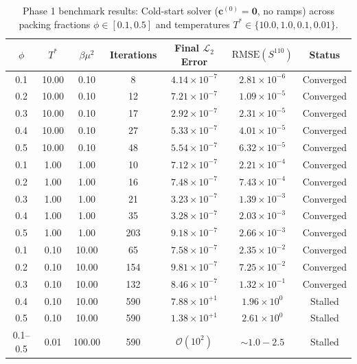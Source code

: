 \documentclass[11pt,a4paper]{article}
\begin{document}
\begin{table}[htbp]
    \centering
    \caption{Phase 1 benchmark results: Cold-start solver ($\mathbf{c}^{(0)}=\mathbf{0}$, no ramps) across packing fractions $\phi \in [0.1, 0.5]$ and temperatures $T^* \in \{10.0, 1.0, 0.1, 0.01\}$.}
    \label{tab:phase1_results}
    \vspace{2mm}
    \begin{tabular}{ccccccc}
        \hline\hline
        $\phi$ & $T^*$ & $\beta\mu^2$ & Iterations & Final $\mathcal{L}_2$ Error & $\text{RMSE}(S^{110})$ & Status \\
        \hline
        0.1 & 10.00 & 0.10  & 8   & $4.14 \times 10^{-7}$ & $2.81 \times 10^{-6}$ & Converged \\
        0.2 & 10.00 & 0.10  & 12  & $7.21 \times 10^{-7}$ & $1.09 \times 10^{-5}$ & Converged \\
        0.3 & 10.00 & 0.10  & 17  & $2.92 \times 10^{-7}$ & $2.31 \times 10^{-5}$ & Converged \\
        0.4 & 10.00 & 0.10  & 27  & $5.33 \times 10^{-7}$ & $4.01 \times 10^{-5}$ & Converged \\
        0.5 & 10.00 & 0.10  & 48  & $5.54 \times 10^{-7}$ & $6.32 \times 10^{-5}$ & Converged \\
        \hline
        0.1 & 1.00  & 1.00  & 10  & $7.12 \times 10^{-7}$ & $2.21 \times 10^{-4}$ & Converged \\
        0.2 & 1.00  & 1.00  & 16  & $7.48 \times 10^{-7}$ & $7.43 \times 10^{-4}$ & Converged \\
        0.3 & 1.00  & 1.00  & 21  & $3.23 \times 10^{-7}$ & $1.39 \times 10^{-3}$ & Converged \\
        0.4 & 1.00  & 1.00  & 35  & $3.28 \times 10^{-7}$ & $2.03 \times 10^{-3}$ & Converged \\
        0.5 & 1.00  & 1.00  & 203 & $9.18 \times 10^{-7}$ & $2.66 \times 10^{-3}$ & Converged \\
        \hline
        0.1 & 0.10  & 10.00 & 65  & $7.58 \times 10^{-7}$ & $2.35 \times 10^{-2}$ & Converged \\
        0.2 & 0.10  & 10.00 & 154 & $9.81 \times 10^{-7}$ & $7.25 \times 10^{-2}$ & Converged \\
        0.3 & 0.10  & 10.00 & 132 & $8.46 \times 10^{-7}$ & $1.32 \times 10^{-1}$ & Converged \\
        0.4 & 0.10  & 10.00 & 590 & $7.88 \times 10^{+1}$ & $1.96 \times 10^{0}$  & Stalled \\
        0.5 & 0.10  & 10.00 & 590 & $1.38 \times 10^{+1}$ & $2.61 \times 10^{0}$  & Stalled \\
        \hline
        0.1--0.5 & 0.01 & 100.00 & 590 & $\mathcal{O}(10^2)$ & $\sim 1.0 - 2.5$ & Stalled \\
        \hline\hline
    \end{tabular}
\end{table}
\end{document}
